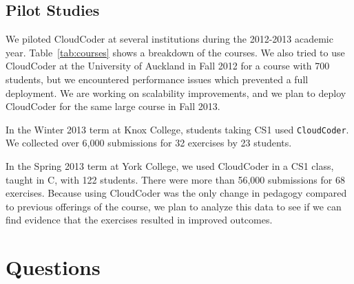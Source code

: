 \documentclass{sig-alternate}
\begin{document}
\subsection{Pilot Studies}

We piloted CloudCoder at several institutions during the 2012-2013
academic year.  Table~\ref{tab:courses} shows a breakdown of the
courses.  We also tried to use CloudCoder at the University of Auckland in Fall 2012 for a
course with 700 students, but we encountered performance issues
which prevented a full deployment.  We are working on scalability
improvements, and we plan to deploy CloudCoder for
the same large course in Fall 2013.

In the Winter 2013 term at Knox College, students taking CS1 used {\tt CloudCoder}.
We collected over 6,000 submissions
for 32 exercises by 23 students.

In the Spring 2013 term at York College, we used CloudCoder in a CS1
class, taught in C, with 122 students.  There were more than 56,000
submissions for 68 exercises.  Because using CloudCoder was the
only change in pedagogy compared to previous offerings of the course,
we plan to analyze this data to see if we can find evidence that
the exercises resulted in improved outcomes.



\section{Questions}\label{sec:questions}

%
\end{document}
